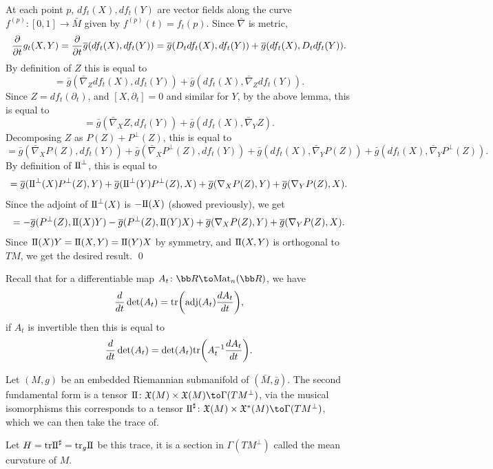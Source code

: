     At each point $p$, $df_t(X),df_t(Y)$ are vector fields along the curve $f^{(p)}\colon[0,1]\to\bar M$ given by $f^{(p)}(t)=f_t(p)$.
    Since $\bar\nabla$ is metric,
    $$ {{\partial }\over{\partial t}}g_t(X,Y) = {{\partial }\over{\partial t}}\overline g(df_t(X),df_t(Y)) = \overline g(D_tdf_t(X),df_t(Y)) + \overline g(df_t(X),D_tdf_t(Y)) . $$
    By definition of $Z$ this is equal to
    $$ = \bar g(\bar\nabla_Zdf_t(X),df_t(Y)) + \bar g(df_t(X),\bar\nabla_Zdf_t(Y)) . $$
    Since $Z=df_t(\partial_t)$, and $[X,\partial_t]=0$ and similar for $Y$, by the above lemma, this is equal to
    $$ = \bar g(\bar\nabla_XZ,df_t(Y)) + \bar g(df_t(X),\bar\nabla_YZ) . $$
    Decomposing $Z$ as $P(Z)+P^\perp(Z)$, this is equal to
    $$ = \bar g(\bar\nabla_XP(Z),df_t(Y)) + \bar g(\bar\nabla_XP^\perp(Z),df_t(Y)) + \bar g(df_t(X),\bar\nabla_YP(Z)) +
    \bar g(df_t(X),\bar\nabla_YP^\perp(Z)) . $$
    By definition of ${\rm I\mkern-1mu\relax I}^\perp$, this is equal to
    $$ = \overline g({\rm I\mkern-1mu\relax I}^\perp(X)P^\perp(Z),Y) + \overline g({\rm I\mkern-1mu\relax I}^\perp(Y)P^\perp(Z),X) + \overline g(\nabla_XP(Z),Y) + \overline g(\nabla_YP(Z),X) . $$
    Since the adjoint of ${\rm I\mkern-1mu\relax I}^\perp(X)$ is $-{\rm I\mkern-1mu\relax I}(X)$ (showed previously), we get
    $$ = -\overline g(P^\perp(Z),{\rm I\mkern-1mu\relax I}(X)Y) - \overline g(P^\perp(Z),{\rm I\mkern-1mu\relax I}(Y)X) + \overline g(\nabla_XP(Z),Y) + \overline g(\nabla_YP(Z),X) . $$
    Since ${\rm I\mkern-1mu\relax I}(X)Y={\rm I\mkern-1mu\relax I}(X,Y)={\rm I\mkern-1mu\relax I}(Y)X$ by symmetry, and ${\rm I\mkern-1mu\relax I}(X,Y)$ is orthogonal to $TM$, we get the desired result.
    \qed

\eproof

Recall that for a differentiable map $A_t\colon\bR\to\mat_n(\bR)$, we have
$$ {{d}\over{dt}}\mathop{\rm det}\nolimits(A_t) = {\rm tr}\mathopen{}\mathclose{\left({\rm adj}(A_t){{dA_t}\over{dt}}\right)} , $$
if $A_t$ is invertible then this is equal to
$$ {{d}\over{dt}}\mathop{\rm det}\nolimits(A_t) = \mathop{\rm det}\nolimits(A_t){\rm tr}\mathopen{}\mathclose{\left(A_t^{-1}{{dA_t}\over{dt}}\right)} . $$

\bdefn

    Let $(M,g)$ be an embedded Riemannian submanifold of $(\bar M,\bar g)$.
    The second fundamental form is a tensor $\sff\colon\X(M)\times\X(M)\to\Gamma(TM^\perp)$, via the musical isomorphisms this corresponds
    to a tensor $\sff^\sharp\colon\X(M)\times\X^*(M)\to\Gamma(TM^\perp)$, which we can then take the trace of.

    Let $H={\rm tr}{\rm I\mkern-1mu\relax I}^\sharp={\rm tr}_g{\rm I\mkern-1mu\relax I}$ be this trace, it is a section in $\Gamma(TM^\perp)$ called the {\emphcolor mean curvature} of $M$.

\edefn

